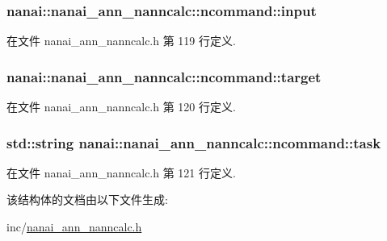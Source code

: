 \subsubsection[{input}]{ nanai\+::nanai\+\_\+ann\+\_\+nanncalc\+::ncommand\+::input}\label{structnanai_1_1nanai__ann__nanncalc_1_1ncommand_acb609b08ab6f835678886dfeec79da71}


在文件 nanai\+\_\+ann\+\_\+nanncalc.\+h 第 119 行定义.

\hypertarget{structnanai_1_1nanai__ann__nanncalc_1_1ncommand_afd7d33dcebc41d012eeef46b346e9854}{}
\subsubsection[{target}]{ nanai\+::nanai\+\_\+ann\+\_\+nanncalc\+::ncommand\+::target}\label{structnanai_1_1nanai__ann__nanncalc_1_1ncommand_afd7d33dcebc41d012eeef46b346e9854}


在文件 nanai\+\_\+ann\+\_\+nanncalc.\+h 第 120 行定义.

\hypertarget{structnanai_1_1nanai__ann__nanncalc_1_1ncommand_a2355346d40218889f8de46778110deec}{}
\subsubsection[{task}]{\setlength{\rightskip}{0pt plus 5cm}std\+::string nanai\+::nanai\+\_\+ann\+\_\+nanncalc\+::ncommand\+::task}\label{structnanai_1_1nanai__ann__nanncalc_1_1ncommand_a2355346d40218889f8de46778110deec}


在文件 nanai\+\_\+ann\+\_\+nanncalc.\+h 第 121 行定义.



该结构体的文档由以下文件生成\+:\begin{DoxyCompactItemize}
\item 
inc/\hyperlink{nanai__ann__nanncalc_8h}{nanai\+\_\+ann\+\_\+nanncalc.\+h}\end{DoxyCompactItemize}
